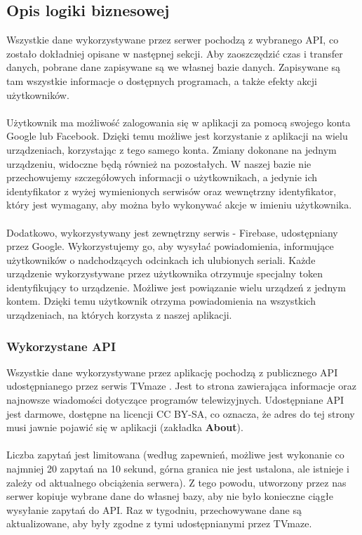 \documentclass[10pt,a4paper]{article}
\begin{document}
\subsection{Opis logiki biznesowej}
Wszystkie dane wykorzystywane przez serwer pochodzą z wybranego API, co zostało dokładniej opisane w następnej sekcji. Aby zaoszczędzić czas i transfer danych, pobrane dane zapisywane są we własnej bazie danych. Zapisywane są tam wszystkie informacje o dostępnych programach, a także efekty akcji użytkowników. \\~\\
Użytkownik ma możliwość zalogowania się w aplikacji za pomocą swojego konta Google lub Facebook. Dzięki temu możliwe jest korzystanie z aplikacji na wielu urządzeniach, korzystając z tego samego konta. Zmiany dokonane na jednym urządzeniu, widoczne będą również na pozostałych. W naszej bazie nie przechowujemy szczegółowych informacji o użytkownikach, a jedynie ich identyfikator z wyżej wymienionych serwisów oraz wewnętrzny identyfikator, który jest wymagany, aby można było wykonywać akcje w imieniu użytkownika. \\~\\
Dodatkowo, wykorzystywany jest zewnętrzny serwis - Firebase, udostępniany przez Google. Wykorzystujemy go, aby wysyłać powiadomienia, informujące użytkowników o nadchodzących odcinkach ich ulubionych seriali. Każde urządzenie wykorzystywane przez użytkownika otrzymuje specjalny token identyfikujący to urządzenie. Możliwe jest powiązanie wielu urządzeń z jednym kontem. Dzięki temu użytkownik otrzyma powiadomienia na wszystkich urządzeniach, na których korzysta z naszej aplikacji.

\subsubsection{Wykorzystane API}
Wszystkie dane wykorzystywane przez aplikację pochodzą z publicznego API udostępnianego przez serwis TVmaze \cite{bib8}. Jest to strona zawierająca informacje oraz najnowsze wiadomości dotyczące programów telewizyjnych. Udostępniane API jest darmowe, dostępne na licencji CC BY-SA, co oznacza, że adres do tej strony musi jawnie pojawić się w aplikacji (zakładka \textbf{About}). \\~\\
Liczba zapytań jest limitowana (według zapewnień, możliwe jest wykonanie co najmniej 20 zapytań na 10 sekund, górna granica nie jest ustalona, ale istnieje i zależy od aktualnego obciążenia serwera). Z tego powodu, utworzony przez nas serwer kopiuje wybrane dane do własnej bazy, aby nie było konieczne ciągłe wysyłanie zapytań do API. Raz w tygodniu, przechowywane dane są aktualizowane, aby były zgodne z tymi udostępnianymi przez TVmaze.
\end{document}
